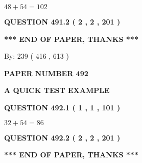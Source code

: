 \documentclass[12pt]{article}
\begin{document}
  
 
 

$ %
48 +  %
54=   %
102$
 
 
  
\vspace{0.2in}
  
{\textbf{\Large{QUESTION
491.2 
 ( 2 , 2 , 201 )
}}}
  
  
   
   
 \vspace{0.2in}
 
   
   
   
   
\vspace{1.0in} 
{\textbf{\large{ *** END OF PAPER, THANKS *** }}} 
   
   
\hspace{1.0in} By: 
 239 ( 416 ,  613 )
   
   
   
   
\newpage 
\setcounter{page}{ 
   492001 } 
   
   
   
   
 {\textbf{ \Large{ PAPER NUMBER  492  }}}
   
   
\vspace{0.2in}
   
   
   
   
   
   
 \vspace{0.2in}
{\LARGE {\textbf{ A QUICK TEST EXAMPLE}}}
   
   
  
\vspace{0.2in}
  
{\textbf{\Large{QUESTION
492.1 
 ( 1 , 1 , 101 )
}}}
  
  
 
 

$ %
32 +  %
54=   %
86$
 
 
  
\vspace{0.2in}
  
{\textbf{\Large{QUESTION
492.2 
 ( 2 , 2 , 201 )
}}}
  
  
   
   
 \vspace{0.2in}
 
   
   
   
   
\vspace{1.0in} 
{\textbf{\large{ *** END OF PAPER, THANKS *** }}} 
   
\end{document}
